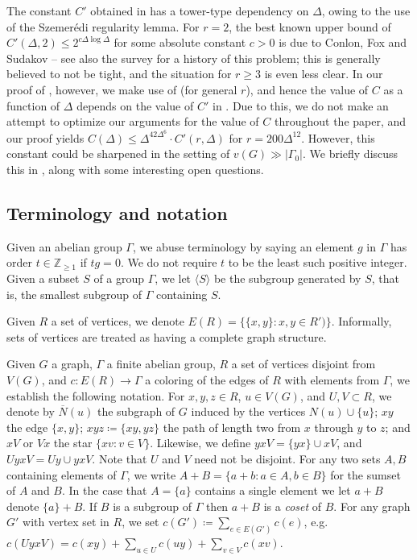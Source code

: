\documentclass{article}
\theoremstyle{definition}
\begin{document}
The constant $C'$ obtained in \cite{ChRSzT} has a tower-type dependency on $\Delta$, owing to the use of the Szemer\'edi regularity lemma. For $r=2$, the best known upper bound of $C'(\Delta, 2)\leq 2^{c\Delta\log \Delta}$ for some absolute constant $c>0$ is due to Conlon, Fox and Sudakov \cite{CFS12} -- see also the survey \cite{CFS15} for a history of this problem; this is generally believed to not be tight, and the situation for $r\geq 3$ is even less clear. In our proof of , however, we make use of  (for general $r$), and hence the value of $C$ as a function of $\Delta$ depends on the value of $C'$ in . Due to this, we do not make an attempt to optimize our arguments for the value of $C$ throughout the paper, and our proof yields $C(\Delta)\leq \Delta^{42\Delta^6}\cdot C'(r,\Delta)$ for $r=200\Delta^{12}$. However, this constant could be sharpened in the setting of $v(G)\gg |\Gamma_0|$. We briefly discuss this in , along with some interesting open questions. 


\subsection{Terminology and notation}\label{sec.terminology}

Given an abelian group $\Gamma$, we abuse terminology by saying an element $g$ in $\Gamma$ has order $t\in \mathbb{Z}_{\geq 1}$ if $tg = 0$. We do not require $t$ to be the least such positive integer. Given a subset $S$ of a group $\Gamma$, we let $\langle S \rangle$ be the subgroup generated by $S$, that is, the smallest subgroup of $\Gamma$ containing $S$.    

Given $R$ a set of vertices, we denote $E(R)=\{\{x,y\}:x,y\in R')\}$. Informally, sets of vertices are treated as having a complete graph structure.

Given $G$ a graph, $\Gamma$ a finite abelian group, $R$ a set of vertices disjoint from $V(G)$, and $c:E(R)\to \Gamma$ a coloring of the edges of $R$ with elements from $\Gamma$, we establish the following notation. For $x,y,z\in R$, $u\in V(G)$, and $U,V\subset R$, we denote by $\overline{N}(u)$ the subgraph of $G$ induced by the vertices $N(u) \cup \{u\}$;  $xy$ the edge $\{x,y\}$;  $xyz\coloneqq \{xy,yz\}$  the path of length two from $x$ through $y$ to $z$; and $xV$ or $Vx$ the star $\{xv:v\in V\}$. Likewise, we define $yxV=\{yx\}\cup xV$, and $UyxV=Uy \cup yxV$. Note that $U$ and $V$ need not be disjoint. For any two sets $A, B$ containing elements of $\Gamma$, we write $A + B = \{a + b: a \in A, b \in B\}$ for the sumset of $A$ and $B$. In the case that $A =\{a\}$ contains a single element we let $a + B$ denote $\{a\} + B$. If $B$ is a subgroup of $\Gamma$ then $a + B$ is a \emph{coset} of $B$. For any graph $G'$ with vertex set in $R$, we set $c(G') \coloneqq  \sum_{e\in E(G')} c(e)$, e.g. $c(UyxV)=c(xy) +\sum_{u\in U} c(uy) +\sum_{v\in V} c(xv).$
\end{document}
